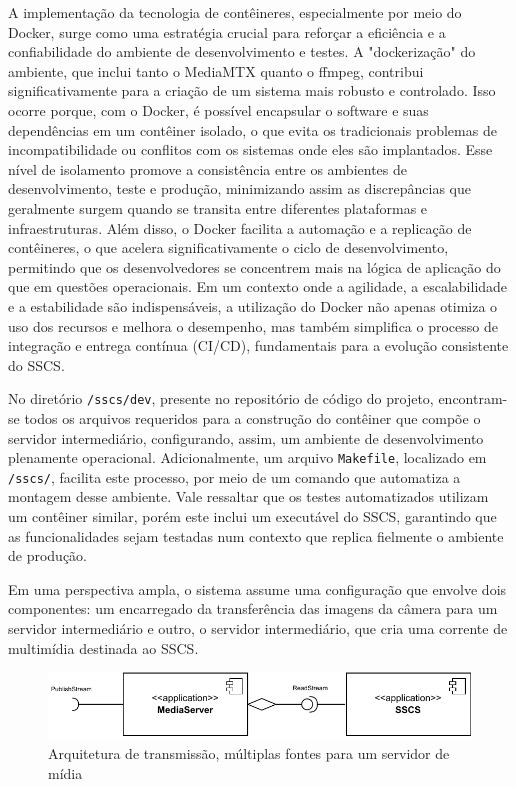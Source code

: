 \documentclass[12pt, %
openright, 
oneside, %
a4paper,    %
brazil]{facom-ufu-abntex2}
\begin{document}
A implementação da tecnologia de contêineres, especialmente por meio do Docker,
surge como uma estratégia crucial para reforçar a eficiência e a confiabilidade
do ambiente de desenvolvimento e testes. A "dockerização" do ambiente, que
inclui tanto o MediaMTX quanto o ffmpeg, contribui significativamente para a
criação de um sistema mais robusto e controlado. Isso ocorre porque, com o
Docker, é possível encapsular o software e suas dependências em um contêiner
isolado, o que evita os tradicionais problemas de incompatibilidade ou
conflitos com os sistemas onde eles são implantados. Esse nível de isolamento
promove a consistência entre os ambientes de desenvolvimento, teste e produção,
minimizando assim as discrepâncias que geralmente surgem quando se transita
entre diferentes plataformas e infraestruturas. Além disso, o Docker facilita a
automação e a replicação de contêineres, o que acelera significativamente o
ciclo de desenvolvimento, permitindo que os desenvolvedores se concentrem mais
na lógica de aplicação do que em questões operacionais. Em um contexto onde a
agilidade, a escalabilidade e a estabilidade são indispensáveis, a utilização
do Docker não apenas otimiza o uso dos recursos e melhora o desempenho, mas
também simplifica o processo de integração e entrega contínua (CI/CD),
fundamentais para a evolução consistente do SSCS.

No diretório \texttt{/sscs/dev}, presente no repositório de código do projeto,
encontram-se todos os arquivos requeridos para a construção do contêiner que
compõe o servidor intermediário, configurando, assim, um ambiente de
desenvolvimento plenamente operacional. Adicionalmente, um arquivo
\texttt{Makefile}, localizado em \texttt{/sscs/}, facilita este processo, por
meio de um comando que automatiza a montagem desse ambiente. Vale ressaltar que
os testes automatizados utilizam um contêiner similar, porém este inclui um
executável do SSCS, garantindo que as funcionalidades sejam testadas num
contexto que replica fielmente o ambiente de produção.

Em uma perspectiva ampla, o sistema assume uma configuração que envolve dois
componentes: um encarregado da transferência das imagens da câmera para um
servidor intermediário e outro, o servidor intermediário, que cria uma corrente
de multimídia destinada ao SSCS.

\begin{figure}[!ht]
	\centering
	\includegraphics[width=1\linewidth]{arch1.pdf}
	\caption[Exemplo de arquiteutra de transmissão]{Arquitetura de transmissão, múltiplas fontes para um servidor de mídia}
	\label{fig:graficosVariandoTamanhoRede}
\end{figure}
\end{document}
